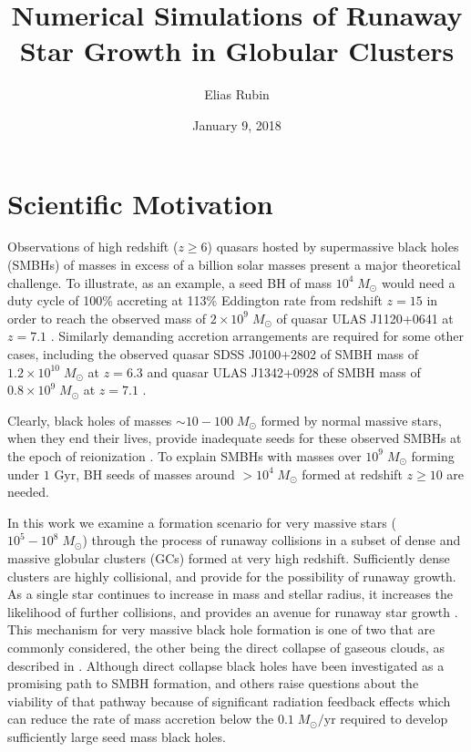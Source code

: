 \documentclass{princeton_astro_thesis}
\title{Numerical Simulations of Runaway Star Growth in Globular Clusters}
\author{Elias Rubin}
\date{January 9, 2018}
\newcommand\Msun{\; M_\odot}
\newcommand\msun{\; M_\odot}
\newcommand\Gyr{\mbox{ Gyr}}
\numberwithin{equation}{section}
\begin{document}
\chapter{Scientific Motivation} \label{Intro}
Observations of high redshift ($z \ge 6$) quasars hosted by supermassive black holes (SMBHs) 
of masses in excess of a billion solar masses 
present a major theoretical challenge.
To illustrate, as an example, 
a seed BH of mass $10^4\msun$ would need a duty cycle of 100\%
accreting at 113\% Eddington rate 
from redshift $z=15$ in order to reach 
the observed mass of $2\times 10^9\msun$ 
of quasar ULAS J1120+0641 at $z=7.1$ \citep[][]{2011Mortlock}.
Similarly demanding accretion arrangements are required for some other
cases, including 
the observed quasar SDSS J0100+2802 of SMBH mass of $1.2\times 10^{10}\msun$ at $z=6.3$ \citep[][]{2015Wu}
and 
quasar ULAS J1342+0928 of SMBH mass of $0.8\times 10^{9}\msun$ at $z=7.1$ \citep[][]{2017Banados}.

Clearly, black holes of masses $\sim 10-100\msun$ formed by normal massive stars,
when they end their lives,
provide inadequate seeds for these observed SMBHs at the epoch of reionization \citep{2003Bromm, 2013Hosokawa}. 
To explain SMBHs with masses over $10^9 \Msun$ forming under $1 \Gyr$, 
BH seeds of masses around $>10^4\Msun$ formed at redshift $z\ge 10$ are needed.

In this work we examine a formation scenario for very massive stars
($10^5-10^8\msun$) 
through the process of runaway collisions in 
a subset of dense and massive globular clusters (GCs) formed at very high redshift.
Sufficiently dense clusters are highly collisional, and provide for the possibility of runaway growth. 
As a single star continues to increase in mass and stellar radius, it increases the likelihood of further collisions, and provides an avenue for runaway star growth \citep{2015Katz}. 
This mechanism for very massive black hole formation is one of two that are commonly considered, 
the other being the direct collapse of gaseous clouds, as described in \citet{2003Bromm}.
Although direct collapse black holes have been investigated as a promising path to SMBH formation, 
\citet{2016Latif} and others raise questions about the viability of that pathway because of significant radiation feedback effects which can reduce the rate of mass accretion below the $0.1 \Msun/\mbox{yr}$ required to develop sufficiently large seed mass black holes.
\end{document}
